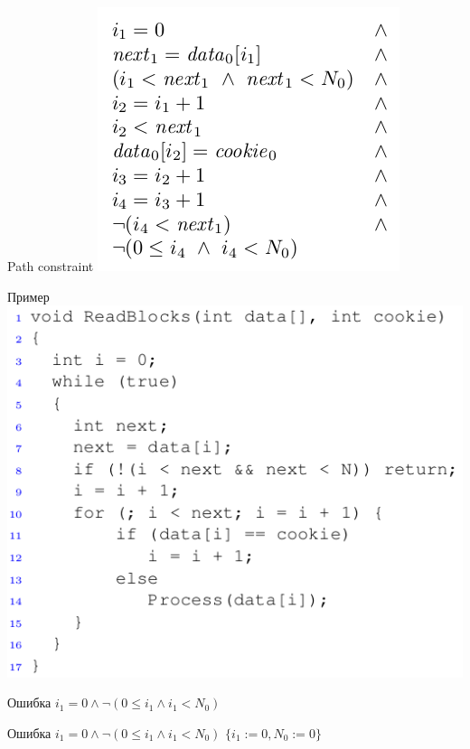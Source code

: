 \documentclass{beamer}
\begin{document}
\begin{frame}{Path constraint}
\includegraphics[scale=0.5]{path_constraint1.png}
\end{frame}

\begin{frame}{Пример}
\includegraphics[scale=0.5]{example1.png}
\end{frame}

\begin{frame}{Ошибка}
$i_1 = 0 \wedge \lnot (0 \le i_1 \wedge i_1 < N_0)$\newline
\end{frame}

\begin{frame}{Ошибка}
$i_1 = 0 \wedge \lnot (0 \le i_1 \wedge i_1 < N_0)$\newline
$\{i_1 := 0, N_0 := 0\}$
\end{frame}
\end{document}
